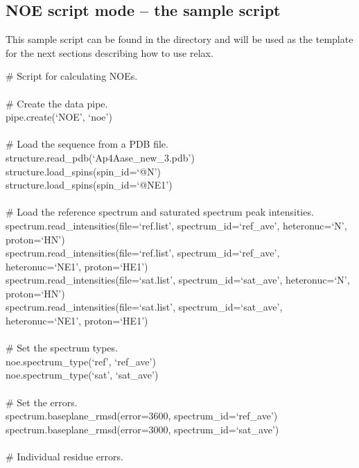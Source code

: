 
\subsection{NOE script mode -- the sample script}

This sample script can be found in the  directory and will be used as the template for the next sections describing how to use relax.

\begin{exampleenv}
\# Script for calculating NOEs. \\
 \\
\# Create the data pipe. \\
pipe.create(`NOE', `noe') \\
 \\
\# Load the sequence from a PDB file. \\
structure.read\_pdb(`Ap4Aase\_new\_3.pdb') \\
structure.load\_spins(spin\_id=`@N') \\
structure.load\_spins(spin\_id=`@NE1') \\
 \\
\# Load the reference spectrum and saturated spectrum peak intensities. \\
spectrum.read\_intensities(file=`ref.list', spectrum\_id=`ref\_ave', heteronuc=`N', proton=`HN') \\
spectrum.read\_intensities(file=`ref.list', spectrum\_id=`ref\_ave', heteronuc=`NE1', proton=`HE1') \\
spectrum.read\_intensities(file=`sat.list', spectrum\_id=`sat\_ave', heteronuc=`N', proton=`HN') \\
spectrum.read\_intensities(file=`sat.list', spectrum\_id=`sat\_ave', heteronuc=`NE1', proton=`HE1') \\
 \\
\# Set the spectrum types. \\
noe.spectrum\_type(`ref', `ref\_ave') \\
noe.spectrum\_type(`sat', `sat\_ave') \\
 \\
\# Set the errors. \\
spectrum.baseplane\_rmsd(error=3600, spectrum\_id=`ref\_ave') \\
spectrum.baseplane\_rmsd(error=3000, spectrum\_id=`sat\_ave') \\
 \\
\# Individual residue errors. \\

\end{exampleenv}
